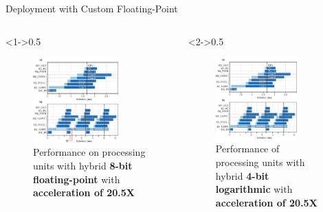 \begin{frame}{Deployment with Custom Floating-Point}
	\begin{columns}[c] %
		
		\begin{column}<1->{0.5\textwidth}
			\begin{figure}
				\includegraphics[width=0.75\textwidth]{../chapters/sbs_accelerator/figures/latency_cfp_cycle.pdf}
				\caption{Performance on processing units with hybrid \textbf{8-bit floating-point} with \textbf{acceleration of 20.5X}}
			\end{figure}
		\end{column}
		
		\begin{column}<2->{0.5\textwidth}
			\begin{figure}
				\includegraphics[width=0.75\textwidth]{../chapters/sbs_accelerator/figures/latency_log_cycle.pdf}
				\caption{Performance of processing units with hybrid \textbf{4-bit logarithmic} with \textbf{acceleration of 20.5X}}
			\end{figure}
		\end{column}
		
	\end{columns}
\end{frame}

